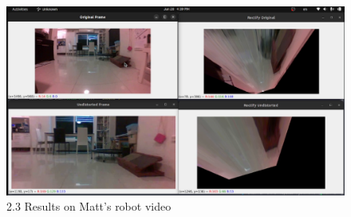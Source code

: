 \documentclass[a4paper, 12pt]{article}
\begin{document}
	\begin{figure}
		\caption{2.3 Results on Matt's robot video}
		\includegraphics[scale=0.3]{images/Matt_vidoe_result.png}
	\end{figure}
\end{document}
